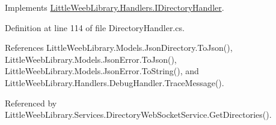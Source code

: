 Implements \mbox{\hyperlink{interface_little_weeb_library_1_1_handlers_1_1_i_directory_handler_a4db23041b31d9b7e46c0be7acb27b0a8}{Little\+Weeb\+Library.\+Handlers.\+I\+Directory\+Handler}}.



Definition at line 114 of file Directory\+Handler.\+cs.



References Little\+Weeb\+Library.\+Models.\+Json\+Directory.\+To\+Json(), Little\+Weeb\+Library.\+Models.\+Json\+Error.\+To\+Json(), Little\+Weeb\+Library.\+Models.\+Json\+Error.\+To\+String(), and Little\+Weeb\+Library.\+Handlers.\+Debug\+Handler.\+Trace\+Message().



Referenced by Little\+Weeb\+Library.\+Services.\+Directory\+Web\+Socket\+Service.\+Get\+Directories().


